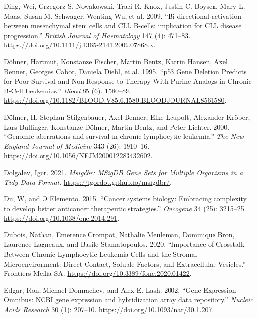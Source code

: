 \documentclass[11pt, a4paper, twosided]{book}
\newenvironment{CSLReferences}%
  {}%
  {\par}
\begin{document}
\begin{CSLReferences}{1}{0}
\leavevmode{}%
Ding, Wei, Grzegorz S. Nowakowski, Traci R. Knox, Justin C. Boysen, Mary L. Maas, Susan M. Schwager, Wenting Wu, et al. 2009. {``{Bi-directional activation between mesenchymal stem cells and CLL B-cells: implication for CLL disease progression}.''} \emph{British Journal of Haematology} 147 (4): 471--83. \url{https://doi.org/10.1111/j.1365-2141.2009.07868.x}.

\leavevmode{}%
Döhner, Hartmut, Konstanze Fischer, Martin Bentz, Katrin Hansen, Axel Benner, Georges Cabot, Daniela Diehl, et al. 1995. {``{p53 Gene Deletion Predicts for Poor Survival and Non-Response to Therapy With Purine Analogs in Chronic B-Cell Leukemias}.''} \emph{Blood} 85 (6): 1580--89. \url{https://doi.org/10.1182/BLOOD.V85.6.1580.BLOODJOURNAL8561580}.

\leavevmode{}%
Döhner, H, Stephan Stilgenbauer, Axel Benner, Elke Leupolt, Alexander Kröber, Lars Bullinger, Konstanze Döhner, Martin Bentz, and Peter Lichter. 2000. {``{Genomic aberrations and survival in chronic lymphocytic leukemia.}''} \emph{The New England Journal of Medicine} 343 (26): 1910--16. \url{https://doi.org/10.1056/NEJM200012283432602}.

\leavevmode{}%
Dolgalev, Igor. 2021. \emph{Msigdbr: MSigDB Gene Sets for Multiple Organisms in a Tidy Data Format}. \url{https://igordot.github.io/msigdbr/}.

\leavevmode{}%
Du, W, and O Elemento. 2015. {``{Cancer systems biology: Embracing complexity to develop better anticancer therapeutic strategies}.''} \emph{Oncogene} 34 (25): 3215--25. \url{https://doi.org/10.1038/onc.2014.291}.

\leavevmode{}%
Dubois, Nathan, Emerence Crompot, Nathalie Meuleman, Dominique Bron, Laurence Lagneaux, and Basile Stamatopoulos. 2020. {``{Importance of Crosstalk Between Chronic Lymphocytic Leukemia Cells and the Stromal Microenvironment: Direct Contact, Soluble Factors, and Extracellular Vesicles}.''} Frontiers Media SA. \url{https://doi.org/10.3389/fonc.2020.01422}.

\leavevmode{}%
Edgar, Ron, Michael Domrachev, and Alex E. Lash. 2002. {``{Gene Expression Omnibus: NCBI gene expression and hybridization array data repository}.''} \emph{Nucleic Acids Research} 30 (1): 207--10. \url{https://doi.org/10.1093/nar/30.1.207}.


\end{CSLReferences}
\end{document}
